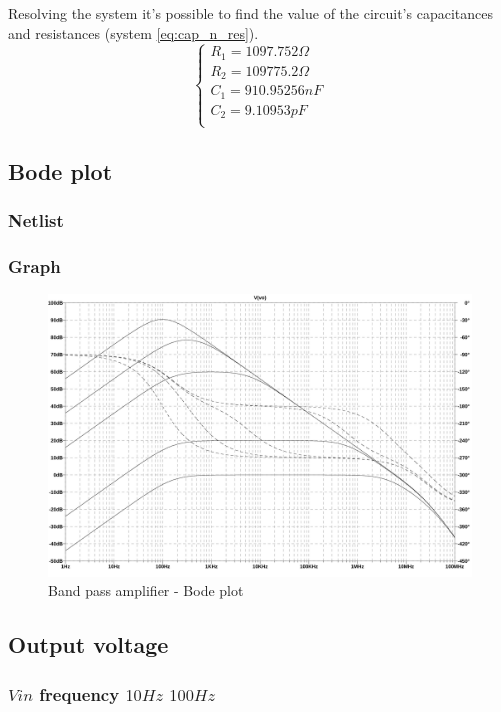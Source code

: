 \documentclass[10pt,a4paper]{article}
\begin{document}
Resolving the system it's possible to find the value of the circuit's capacitances and resistances (system \ref{eq:cap_n_res}).
\begin{equation}
\left\{
\begin{array}{l}
R_1 = 1097.752\Omega\\
R_2 = 109775.2\Omega\\
C_1 = 910.95256nF\\
C_2 = 9.10953pF\\
\end{array}
\right. \label{eq:cap_n_res}
\end{equation}

\subsection{Bode plot}
\subsubsection{Netlist}


\subsubsection{Graph}
\begin{figure}[H]
  \centering
  \includegraphics[width=14cm]{graph/2d3.jpg}
  \caption{Band pass amplifier - Bode plot}
  \label{2d3graph}
\end{figure}

\subsection{Output voltage}
\subsubsection{$Vin$ frequency $10Hz$ $100Hz$}

\end{document}

